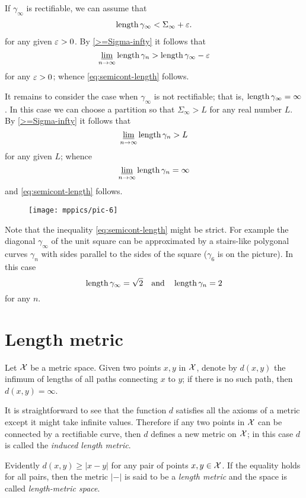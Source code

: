 If $\gamma_\infty$ is rectifiable, we can assume that 
\begin{align*}
\mathop{\rm length}\nolimits\gamma_\infty<\Sigma_\infty+\varepsilon.
\end{align*}
for any given $\varepsilon>0$.
By \ref{>=Sigma-infty} it follows that 
$$\varliminf_{n\to\infty} \mathop{\rm length}\nolimits\gamma_n > \mathop{\rm length}\nolimits\gamma_\infty-\varepsilon$$
for any $\varepsilon>0$; whence \ref{eq:semicont-length} follows.

It remains to consider the case when $\gamma_\infty$ is not rectifiable; 
that is, $\mathop{\rm length}\nolimits\gamma_\infty=\infty$.
In this case we can choose a partition so that $\Sigma_\infty>L$ for any real number $L$.
By \ref{>=Sigma-infty} it follows that 
$$\varliminf_{n\to\infty} \mathop{\rm length}\nolimits\gamma_n > L$$
for any given $L$; whence 
\[\varliminf_{n\to\infty}\mathop{\rm length}\nolimits\gamma_n=\infty\]
and \ref{eq:semicont-length} follows.
\qeds


\begin{wrapfigure}{o}{20 mm}
\vskip-0mm
\centering
\texttt{[image: mppics/pic-6]}
\end{wrapfigure}


Note that the inequality \ref{eq:semicont-length} might be strict.
For example the diagonal $\gamma_\infty$ of the unit square 
can be  approximated by a stairs-like
polygonal curves $\gamma_n$
with sides parallel to the sides of the square ($\gamma_6$ is on the picture).
In this case
\[\mathop{\rm length}\nolimits\gamma_\infty=\sqrt{2}\quad
\text{and}\quad \mathop{\rm length}\nolimits\gamma_n=2\]
for any $n$.



\section{Length metric}

Let $\mathcal{X}$ be a metric space.
Given two points $x,y$ in $\mathcal{X}$, denote by $d(x,y)$ the infimum of lengths of all paths connecting $x$ to $y$; if there is no such path, then $d(x,y)=\infty$.

It is straightforward to see that the function $d$ satisfies all the axioms of a metric except it might take infinite values.
Therefore if any two points in $\mathcal{X}$ can be connected by a rectifiable curve, then $d$ defines a new metric on $\mathcal{X}$;
in this case $d$ is called the \emph{induced length metric}.

Evidently $d(x,y)\ge |x-y|$ for any pair of points $x,y\in \mathcal{X}$.
If the equality holds for all pairs, then the metric $|-|$ is said to be a \emph{length metric} and the space is called \emph{length-metric space}.

